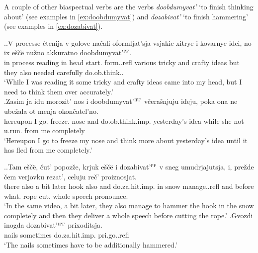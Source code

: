 A couple of other biaspectual verbs  are the verbs \textit{doobdumyvat'} `to finish thinking about' (see examples in \ref{ex:doobdumyvat}) and \textit{dozabivat'} `to finish hammering' (see examples in \ref{ex:dozabivat}).

\ex.\label{ex:doobdumyvat}\ag.V processe \v{c}tenija v golove na\v{c}ali oformljat'sja vsjakie xitrye i kovarnye idei, no ix e\v{s}\v{c}\"{e} nu\v{z}no akkuratno doobdumyvat'$^{\textsc{pf}}$.\\
in process reading in head start. form..refl various tricky and crafty ideas but they also needed carefully do.ob.think..\\
\trans `While I was reading it some tricky and crafty ideas came into my head, but I need to think them over accurately.'\\
\bg.Zasim ja idu morozit' nos i doobdumyvat'$^{\textsc{ipf}}$ v\v{c}era\v{s}njuju ideju, poka ona ne ube\v{z}ala ot menja okon\v{c}atel'no.\\
hereupon I go. freeze. nose and do.ob.think.imp. yesterday's idea while she not u.run. from me completely\\
\trans `Hereupon I go to freeze my nose and think more about yesterday's idea until it has fled from me completely.'


\ex.\label{ex:dozabivat}\ag.Tam e\v{s}\v{c}\"{e}, \v{c}ut' popoz\v{z}e, krjuk e\v{s}\v{c}\"{e} i dozabivat'$^{\textsc{pf}}$ v sneg umudrjajutsja, i, pre\v{z}de \v{c}em verjovku rezat', celuju re\v{c}' proiznosjat.\\
there also {a bit} later hook also and do.za.hit.imp. in snow manage..refl and before what. rope cut. whole speech pronounce.\\
\trans `In the same video, a bit later, they also manage to hammer the hook in the snow completely and then they deliver a whole speech before cutting the rope.'
\bg.Gvozdi inogda dozabivat'$^{\textsc{ipf}}$ prixoditsja.\\
nails sometimes do.za.hit.imp. pri.go..refl\\
\trans `The nails sometimes have to be additionally hammered.'\\

